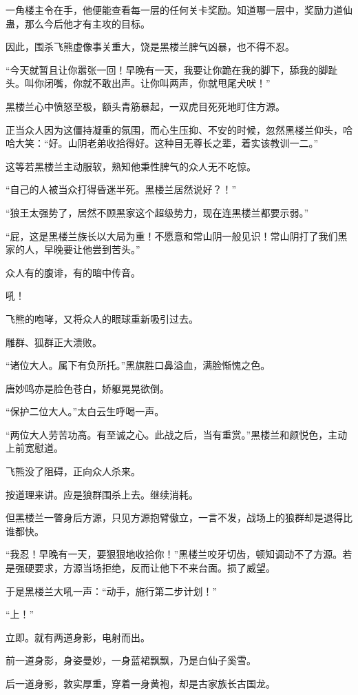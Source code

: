 \begin{this_body}
一角楼主令在手，他便能查看每一层的任何关卡奖励。知道哪一层中，奖励力道仙蛊，那么今后他才有主攻的目标。

因此，围杀飞熊虚像事关重大，饶是黑楼兰脾气凶暴，也不得不忍。

“今天就暂且让你嚣张一回！早晚有一天，我要让你跪在我的脚下，舔我的脚趾头。叫你闭嘴，你就不敢出声。让你叫两声，你就甩尾犬吠！”

黑楼兰心中愤怒至极，额头青筋暴起，一双虎目死死地盯住方源。

正当众人因为这僵持凝重的氛围，而心生压抑、不安的时候，忽然黑楼兰仰头，哈哈大笑：“好。山阴老弟收拾得好。这种目无尊长之辈，着实该教训一二。”

这等若黑楼兰主动服软，熟知他秉性脾气的众人无不吃惊。

“自己的人被当众打得昏迷半死。黑楼兰居然说好？！”

“狼王太强势了，居然不顾黑家这个超级势力，现在连黑楼兰都要示弱。”

“屁，这是黑楼兰族长以大局为重！不愿意和常山阴一般见识！常山阴打了我们黑家的人，早晚要让他尝到苦头。”

众人有的腹诽，有的暗中传音。

吼！

飞熊的咆哮，又将众人的眼球重新吸引过去。

雕群、狐群正大溃败。

“诸位大人。属下有负所托。”黑旗胜口鼻溢血，满脸惭愧之色。

唐妙鸣亦是脸色苍白，娇躯晃晃欲倒。

“保护二位大人。”太白云生呼喝一声。

“两位大人劳苦功高。有至诚之心。此战之后，当有重赏。”黑楼兰和颜悦色，主动上前宽慰道。

飞熊没了阻碍，正向众人杀来。

按道理来讲。应是狼群围杀上去。继续消耗。

但黑楼兰一瞥身后方源，只见方源抱臂傲立，一言不发，战场上的狼群却是退得比谁都快。

“我忍！早晚有一天，要狠狠地收拾你！”黑楼兰咬牙切齿，顿知调动不了方源。若是强硬要求，方源当场拒绝，反而让他下不来台面。损了威望。

于是黑楼兰大吼一声：“动手，施行第二步计划！”

“上！”

立即。就有两道身影，电射而出。

前一道身影，身姿曼妙，一身蓝裙飘飘，乃是白仙子奚雪。

后一道身影，敦实厚重，穿着一身黄袍，却是古家族长古国龙。


\end{this_body}
